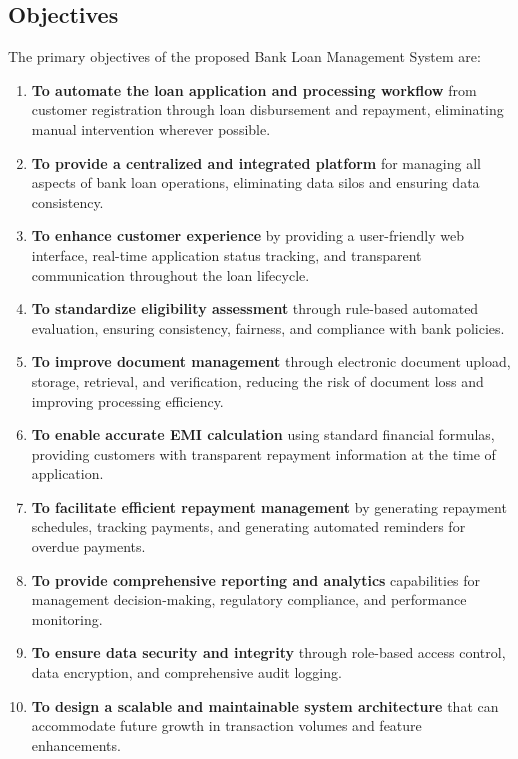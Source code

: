 \subsection{Objectives}

The primary objectives of the proposed Bank Loan Management System are:

\begin{enumerate}
  \item \textbf{To automate the loan application and processing workflow} from customer registration through loan disbursement and repayment, eliminating manual intervention wherever possible.
  \item \textbf{To provide a centralized and integrated platform} for managing all aspects of bank loan operations, eliminating data silos and ensuring data consistency.
  \item \textbf{To enhance customer experience} by providing a user-friendly web interface, real-time application status tracking, and transparent communication throughout the loan lifecycle.
  \item \textbf{To standardize eligibility assessment} through rule-based automated evaluation, ensuring consistency, fairness, and compliance with bank policies.
  \item \textbf{To improve document management} through electronic document upload, storage, retrieval, and verification, reducing the risk of document loss and improving processing efficiency.
  \item \textbf{To enable accurate EMI calculation} using standard financial formulas, providing customers with transparent repayment information at the time of application.
  \item \textbf{To facilitate efficient repayment management} by generating repayment schedules, tracking payments, and generating automated reminders for overdue payments.
  \item \textbf{To provide comprehensive reporting and analytics} capabilities for management decision-making, regulatory compliance, and performance monitoring.
  \item \textbf{To ensure data security and integrity} through role-based access control, data encryption, and comprehensive audit logging.
  \item \textbf{To design a scalable and maintainable system architecture} that can accommodate future growth in transaction volumes and feature enhancements.
\end{enumerate}

